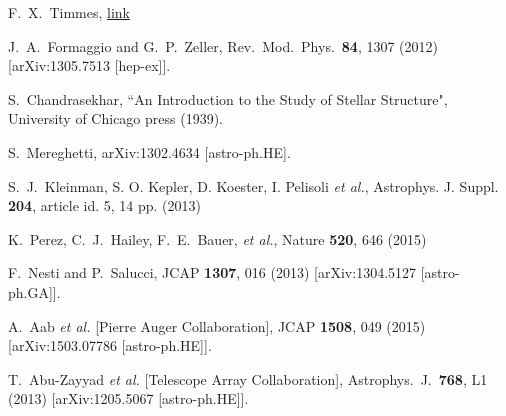 \documentclass[twocolumn, preprintnumbers,amsmath,amssymb,prd, superscriptaddress]{revtex4}
\begin{document}
\begin{thebibliography}{99}
F.~X.~Timmes, \href{http://cococubed.asu.edu/code_pages/coldwd.shtml}{link}

  J.~A.~Formaggio and G.~P.~Zeller,
  Rev.\ Mod.\ Phys.\  {\bf 84}, 1307 (2012)
  [arXiv:1305.7513 [hep-ex]].


S.~Chandrasekhar, ``An Introduction to the Study of Stellar Structure", University of Chicago press (1939).

  S.~Mereghetti,
  arXiv:1302.4634 [astro-ph.HE].


S.~J.~Kleinman, S. O. Kepler, D. Koester, I. Pelisoli  {\it et al.}, Astrophys. J. Suppl. {\bf 204}, article
id. 5, 14 pp. (2013)

K.~Perez, C.~J.~Hailey, F.~E.~Bauer, {\it et al.}, Nature {\bf 520}, 646 (2015)

  F.~Nesti and P.~Salucci,
  JCAP {\bf 1307}, 016 (2013)
  [arXiv:1304.5127 [astro-ph.GA]].


  A.~Aab {\it et al.} [Pierre Auger Collaboration],
  JCAP {\bf 1508}, 049 (2015)
  [arXiv:1503.07786 [astro-ph.HE]].


  T.~Abu-Zayyad {\it et al.} [Telescope Array Collaboration],
  Astrophys.\ J.\  {\bf 768}, L1 (2013)
  [arXiv:1205.5067 [astro-ph.HE]].



\end{thebibliography}
\end{document}
